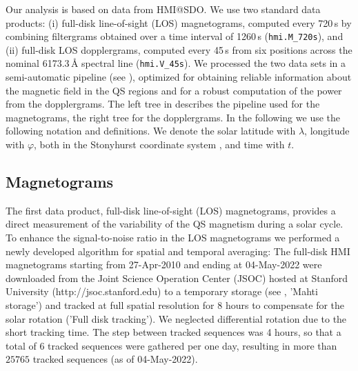 \documentclass{aa}
\begin{document}
Our analysis is based on data from HMI@SDO. We use two standard data products: (i) full-disk line-of-sight (LOS) magnetograms, computed every 720\,s by combining filtergrams obtained over a time interval of 1260\,s (\texttt{hmi.M\_720s}), and (ii) full-disk LOS dopplergrams, computed every 45\,s from six positions across the nominal 6173.3\,\AA{} spectral line (\texttt{hmi.V\_45s}). We processed the two data sets in a semi-automatic pipeline (see ), optimized for obtaining reliable information about the magnetic field in the QS regions and for a robust computation of the \fff power from the dopplergrams. The left tree in  describes the pipeline used for the magnetograms, the right tree for the dopplergrams.
In the following we use the following notation and definitions. 
We denote the solar 
latitude with $\lambda$, longitude with $\varphi$, 
both in the Stonyhurst coordinate system \cite[]{Thomson06}, 
and time with $t$. 



\subsection{Magnetograms}

The first data product, full-disk line-of-sight (LOS) magnetograms, provides a direct measurement of the variability of the %
QS
magnetism during a solar cycle. To enhance the signal-to-noise ratio in the LOS magnetograms we performed a newly developed algorithm for spatial and temporal averaging: The full-disk HMI magnetograms starting from 27-Apr-2010 and ending at 
04-May-2022
were downloaded from the Joint Science Operation Center (JSOC) hosted at Stanford University (http://jsoc.stanford.edu) to a temporary storage (see , 'Mahti storage') and tracked at full spatial resolution for 8 hours to compensate for the solar rotation ('Full disk tracking').
We neglected differential rotation due to
the short tracking time.
The step between tracked sequences was 4 hours, so that a total of 6 tracked sequences were gathered per one day, resulting in more than 
$25765$ tracked sequences (as of 04-May-2022).
\end{document}
